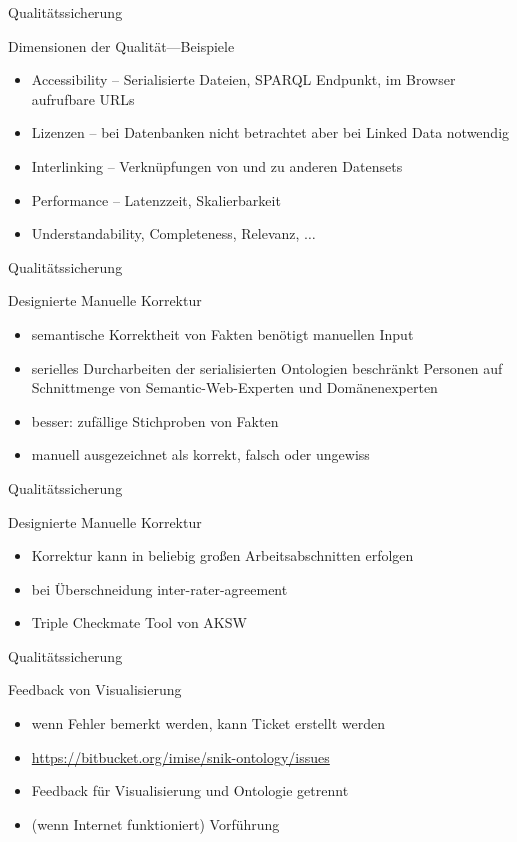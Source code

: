 \documentclass[14pt,aspectratio=1610]{beamer}
\begin{document}
\begin{frame}{Qualitätssicherung}
\begin{block}{Dimensionen der Qualität---Beispiele}
\begin{itemize}
\item Accessibility -- Serialisierte Dateien, SPARQL Endpunkt, im Browser aufrufbare URLs
\item Lizenzen -- bei Datenbanken nicht betrachtet aber bei Linked Data notwendig 
\item Interlinking -- Verknüpfungen von und zu anderen Datensets 
\item Performance -- Latenzzeit, Skalierbarkeit
\item Understandability, Completeness, Relevanz, $\ldots$
\end{itemize}
\end{block}
\end{frame}

\begin{frame}{Qualitätssicherung}
\begin{block}{Designierte Manuelle Korrektur}
\begin{itemize}
\item semantische Korrektheit von Fakten benötigt manuellen Input
\item serielles Durcharbeiten der serialisierten Ontologien beschränkt Personen auf Schnittmenge von Semantic-Web-Experten und Domänenexperten
\item besser: zufällige Stichproben von Fakten
\item manuell ausgezeichnet als korrekt, falsch oder ungewiss 
\end{itemize}
\end{block}
\end{frame}

\begin{frame}{Qualitätssicherung}
\begin{block}{Designierte Manuelle Korrektur}
\begin{itemize}
\item Korrektur kann in beliebig großen Arbeitsabschnitten erfolgen
\item bei Überschneidung inter-rater-agreement
\item Triple Checkmate Tool von AKSW 
\end{itemize}
\end{block}
\end{frame}

\begin{frame}{Qualitätssicherung}
\begin{block}{Feedback von Visualisierung}
\begin{itemize}
\item wenn Fehler bemerkt werden, kann Ticket erstellt werden
\item \url{https://bitbucket.org/imise/snik-ontology/issues}
\item Feedback für Visualisierung und Ontologie getrennt
\item (wenn Internet funktioniert) Vorführung 
\end{itemize}
\end{block}
\end{frame}
\end{document}
